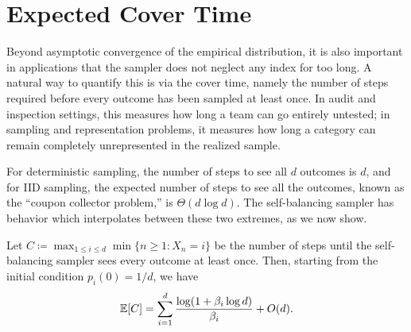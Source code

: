 
\section{Expected Cover Time}

Beyond asymptotic convergence of the empirical distribution, it is also important in applications
that the sampler does not neglect any index for too long. A natural way to quantify this is via the cover
time, namely the number of steps required before every outcome has been sampled at least once.
 In audit and inspection settings, this measures how long a team can go entirely untested;
 in sampling and representation problems, it measures how long a category can remain completely unrepresented in the realized sample.

For deterministic sampling, the number of steps to see all $d$ outcomes is $d$, and for IID sampling, the expected number of steps to see all the outcomes, known as the ``coupon collector problem,'' is $\Theta(d\log d)$. The self-balancing sampler has behavior which interpolates between these two extremes, as we now show.

\begin{theorem}\label{thm:expected_cover_time}
    Let $C \coloneqq \max_{1 \leq i \leq d} \min \{ n \geq 1 : X_n = i \}$ be the number of steps
     until the self-balancing sampler sees every outcome at least once. Then, starting from the initial 
     condition $p_i(0) = 1/d$, we have
    $$\mathbb{E}[C] = \sum_{i=1}^d \frac{\log(1 + \beta_i \log d)}{\beta_i} + O(d).$$
\end{theorem}

